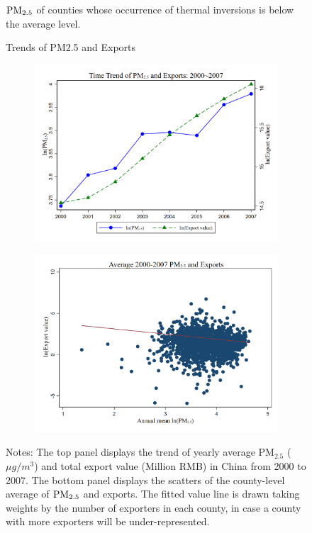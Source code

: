 \documentclass[12pt]{article}
\begin{document}
\begin{figure}[H]
{    $\rm PM_{2.5}$ of counties whose occurrence of thermal inversions is below the average level.}
  \end{figure}

  \newpage
  \centering
  \begin{figure}[H]
    \centering
     \caption{Trends of PM2.5 and Exports}\label{fig:4}
      \begin{subfigure}[b]{.75\textwidth}
       \centering
        \includegraphics[width=\linewidth]{images_updated/exp_pm25_trend}
        \caption{}\label{fig:fig_4a}
        \end{subfigure}
         \begin{subfigure}[b]{.75\textwidth}
         \centering
         \includegraphics[width=\linewidth]{images_updated/exp_pm25}
          \caption{}\label{fig:fig_4b}
          \end{subfigure}
    \small
    \caption*{Notes: The top panel displays the trend of yearly average $\mathrm{PM_{2.5}}$ ($\mu g/m^3$) and total export value (Million RMB) in China from 2000 to 2007. The bottom panel displays the scatters of the county-level average of $\rm PM_{2.5}$ and exports. The  fitted value line is drawn taking weights by the number of exporters in each county, in case a county with more exporters will be under-represented.}
  \end{figure}
  
\end{document}
